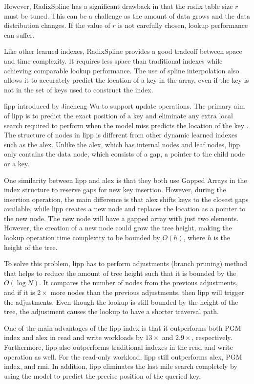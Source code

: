 However, RadixSpline has a significant drawback in that the radix table size $r$ must be tuned. This can be a challenge as the amount of data grows and the data distribution changes. If the value of $r$ is not carefully chosen, lookup performance can suffer.

Like other learned indexes, RadixSpline provides a good tradeoff between space and time complexity. It requires less space than traditional indexes while achieving comparable lookup performance. The use of spline interpolation also allows it to accurately predict the location of a key in the array, even if the key is not in the set of keys used to construct the index.



\acrfull{lipp} introduced by Jiacheng Wu to support update operations. The primary aim of \acrshort{lipp} is to predict the exact position of a key and eliminate any extra local search required to perform when the model miss predicts the location of the key \cite{LIPP}. The structure of nodes in \acrshort{lipp} is different from other dynamic learned indexes such as the \acrfull{alex}. Unlike the \acrshort{alex}, which has internal nodes and leaf nodes, \acrshort{lipp} only contains the data node, which consists of a gap, a pointer to the child node or a key.

One similarity between \acrshort{lipp} and \acrshort{alex} is that they both use Gapped Arrays in the index structure to reserve gaps for new key insertion. However, during the insertion operation, the main difference is that \acrshort{alex} shifts keys to the closest gaps available, while \acrshort{lipp} creates a new node and replaces the location as a pointer to the new node. The new node will have a gapped array with just two elements. However, the creation of a new node could grow the tree height, making the lookup operation time complexity to be bounded by $O(h)$, where $h$ is the height of the tree.

To solve this problem, \acrshort{lipp} has to perform adjustments (branch pruning) method that helps to reduce the amount of tree height such that it is bounded by the $O(\log N)$. It compares the number of nodes from the previous adjustments, and if it is $2\times$ more nodes than the previous adjustments, then \acrshort{lipp} will trigger the adjustments. Even though the lookup is still bounded by the height of the tree, the adjustment causes the lookup to have a shorter traversal path.

One of the main advantages of the \acrshort{lipp} index is that it outperforms both PGM index and \acrshort{alex} in read and write workloads by $13\times$ and $2.9\times$, respectively. Furthermore, \acrshort{lipp} also outperforms traditional indexes in the read and write operation as well. For the read-only workload, \acrshort{lipp} still outperforms \acrshort{alex}, PGM index, and \acrshort{rmi}. In addition, \acrshort{lipp} eliminates the last mile search completely by using the model to predict the precise position of the queried key.


